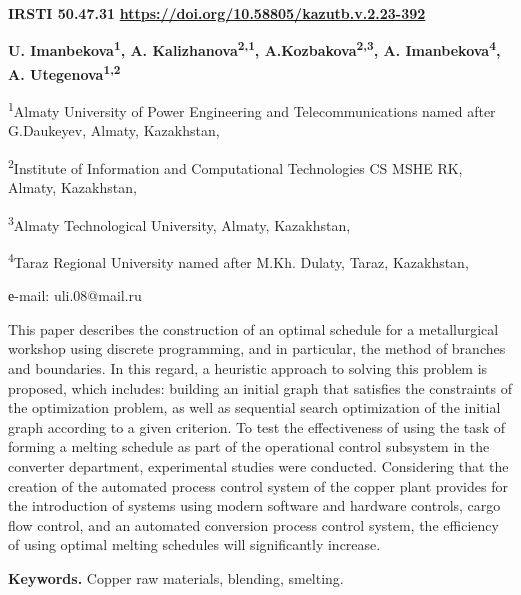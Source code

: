\newpage
{\bfseries IRSTI 50.47.31}
\hfill {\bfseries \href{https://doi.org/10.58805/kazutb.v.2.23-392}{https://doi.org/10.58805/kazutb.v.2.23-392}}


\begin{center}
{\bfseries U. Imanbekova\textsuperscript{1}, A.
Kalizhanova\textsuperscript{2,1}, A.Kozbakova\textsuperscript{2,3}, A.
Imanbekova\textsuperscript{4}, A. Utegenova\textsuperscript{1,2}}

\textsuperscript{1}Almaty University of Power Engineering and
Telecommunications named after G.Daukeyev, Almaty, Kazakhstan,

\textsuperscript{2}Institute of Information and Computational
Technologies CS MSHE RK, Almaty, Kazakhstan,

\textsuperscript{3}Almaty Technological University, Almaty, Kazakhstan,

\textsuperscript{4}Taraz Regional University named after M.Kh. Dulaty,
Taraz, Kazakhstan,

е-mail: uli.08@mail.ru
\end{center}

This paper describes the construction of an optimal schedule for a
metallurgical workshop using discrete programming, and in particular,
the method of branches and boundaries. In this regard, a heuristic
approach to solving this problem is proposed, which includes: building
an initial graph that satisfies the constraints of the optimization
problem, as well as sequential search optimization of the initial graph
according to a given criterion. To test the effectiveness of using the
task of forming a melting schedule as part of the operational control
subsystem in the converter department, experimental studies were
conducted. Considering that the creation of the automated process
control system of the copper plant provides for the introduction of
systems using modern software and hardware controls, cargo flow control,
and an automated conversion process control system, the efficiency of
using optimal melting schedules will significantly increase.

{\bfseries Keywords.} Copper raw materials, blending, smelting.

